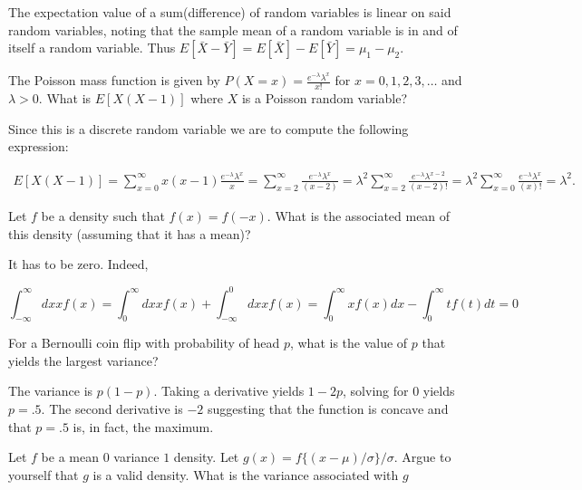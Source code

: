 \documentclass{homework}
\begin{document}
The expectation value of a sum(difference) of random variables is linear on said random variables, noting that the sample mean of a random variable is in and of itself a random variable.  Thus $E[\bar X - \bar Y] = E[\bar X] - E[\bar Y] = \mu_1 - \mu_2$. \\

\begin{tcolorbox}[title=Question 17]
The Poisson mass function is given by $P(X = x) = \frac{e^{-\lambda} \lambda^x}{x!}$ for $x=0,1,2,3,\ldots$ and $\lambda >0$. What is $E[X(X-1)]$ where $X$ is a Poisson random variable?
\end{tcolorbox}

Since this is a discrete random variable we are to compute the following expression:

\begin{align*}
    E[X(X-1)]=\sum_{x=0}^{\infty} x(x-1) \frac{e^{-\lambda} \lambda^x}{x\!} = \sum_{x=2}^{\infty} \frac{e^{-\lambda} \lambda^x}{(x-2)\!} = \lambda^2  \sum_{x=2}^\infty \frac{e^{-\lambda} \lambda^{x-2}}{(x-2)!} = \lambda^2 \sum_{x=0}^\infty \frac{e^{-\lambda} \lambda^{x}}{(x)!} = \lambda^2.
\end{align*}

\begin{tcolorbox}[title=Question 18]
Let $f$ be a density such that $f(x) = f(-x)$. What is the associated mean of this density (assuming that it has a mean)?
\end{tcolorbox}

It has to be zero. Indeed, 

$$\int_{-\infty}^{\infty} dx xf(x)
= \int_{0}^{\infty} dx xf(x) + \int_{-\infty}^0 dx xf(x) = \int_{0}^\infty x f(x) dx - \int_{0}^\infty t f(t) dt = 0$$

\begin{tcolorbox}[title=Question 19]
For a Bernoulli coin flip with probability of  head $p$, what is the value of $p$ that yields the largest variance?
\end{tcolorbox}

The variance is $p(1-p)$. Taking a derivative yields $1-2p$, solving for 0 yields $p=.5$. The second derivative is $-2$ suggesting that the function is concave and that $p=.5$ is, in fact, the maximum.\\

\begin{tcolorbox}[title=Question 20]
Let $f$ be a mean $0$ variance $1$ density. Let $g(x) = f\{ (x - \mu) / \sigma \} / \sigma$. Argue to yourself that $g$ is a valid density. What is the variance associated with $g$
\end{tcolorbox}
\end{document}

